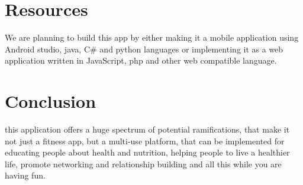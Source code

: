 \documentclass[12pt]{article}
\begin{document}
\section{Resources}
We are planning to build this app by either making it a mobile application using Android studio, java, C\# and python languages or implementing it as a web application written in JavaScript, php and  other web compatible language. 

\section{Conclusion}
this application offers a huge spectrum of potential ramifications, that make it not just a fitness app, but a multi-use platform, that can be implemented for educating people about health and nutrition, helping people to live a healthier life, promote networking and relationship building and all this while you are having fun. 




\end{document}
